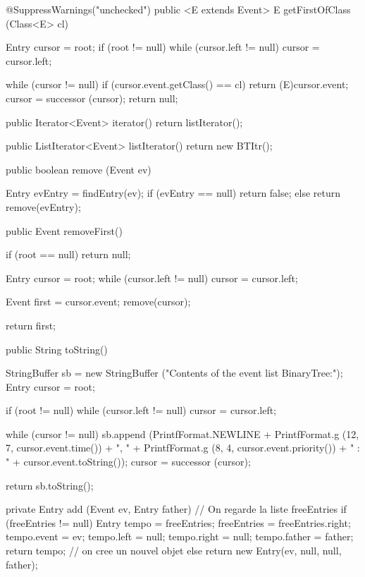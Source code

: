 \begin{hide}
\begin{code}
\begin{hide}
   @SuppressWarnings("unchecked")
   public <E extends Event> E getFirstOfClass (Class<E> cl) {
      Entry cursor = root;
      if (root != null)
         while (cursor.left != null)
            cursor = cursor.left;

      while (cursor != null) {
         if (cursor.event.getClass() == cl)
            return (E)cursor.event;
         cursor = successor (cursor);
      }
      return null;
   }

   public Iterator<Event> iterator() {
      return listIterator();
   }

   public ListIterator<Event> listIterator() {
      return new BTItr();
   }\end{hide}

   public boolean remove (Event ev)\begin{hide} {
      Entry evEntry = findEntry(ev);
      if (evEntry == null)
         return false;
      else
         return remove(evEntry);
   }\end{hide}

   public Event removeFirst()\begin{hide} {
      if (root == null)
         return null;

      Entry cursor = root;
      while (cursor.left != null)
         cursor = cursor.left;

      Event first = cursor.event;
      remove(cursor);

      return first;
   }\end{hide}

   public String toString()\begin{hide} {
      StringBuffer sb = new StringBuffer ("Contents of the event list BinaryTree:");
      Entry cursor = root;

      if (root != null)
         while (cursor.left != null)
            cursor = cursor.left;

      while (cursor != null) {
         sb.append (PrintfFormat.NEWLINE +
                    PrintfFormat.g (12, 7, cursor.event.time()) + ", " +
                    PrintfFormat.g (8, 4, cursor.event.priority()) +
                    " : " + cursor.event.toString());
         cursor = successor (cursor);
      }

      return sb.toString();
   }

   private Entry add (Event ev, Entry father) {
      // On regarde la liste freeEntries
      if (freeEntries != null) {
         Entry tempo = freeEntries;
         freeEntries = freeEntries.right;
         tempo.event = ev;
         tempo.left  = null;
         tempo.right = null;
         tempo.father = father;
         return tempo;
      }
      // on cree un nouvel objet
      else
         return new Entry(ev, null, null, father);
   }


\end{hide}
\end{code}
\end{hide}
